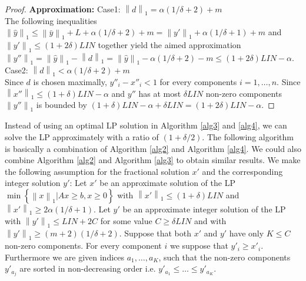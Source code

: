 \documentclass[a4paper,11pt]{article}
\newcommand{\mengest}[2]{\left\{#1|#2\right\}}
\newcommand{\nor}[1]{\left\|#1\right\|}
\begin{document}
\begin{proof}
	{\bf Approximation:} Case1: $\nor{d}_1 = \alpha (1/ \delta +2)+ m$\\
	The following inequalities $\nor{\hat{y}}_1 \leq \nor{\bar{y}}_1 +L +\alpha(1/ \delta +2) +m = 
	\nor{y'}_1 + \alpha(1/\delta+1) +m$ and
	$\nor{y'}_1 \leq (1+2\delta) \mathit{LIN}$ together yield the aimed approximation
	$\nor{y''}_1 = \nor{\hat{y}}_1 - \nor{d}_1 = \nor{\hat{y}}_1 -\alpha(1/\delta+2) -m 
	\leq (1+2\delta) \mathit{LIN} - \alpha$.\\
	Case2: $\nor{d}_1 < \alpha (1/ \delta +2)+ m$\\
	Since $d$ is chosen maximally, $y''_i-x''_i < 1$ for every components $i= 1, \ldots ,n$. Since 
	$\nor{x''}_1 \leq (1+\delta) \mathit{LIN} - \alpha$	and $y''$ has at most $\delta \mathit{LIN}$ non-zero
	components $\nor{y''}_1$ is bounded by $(1+\delta) \mathit{LIN} - \alpha + \delta \mathit{LIN} = 
	(1+2\delta) \mathit{LIN} - \alpha$.
\end{proof}
Instead of using an optimal LP solution in Algorithm \ref{alg3} and \ref{alg4}, we can solve the LP approximately 
with a ratio of $(1+\delta /2)$. The following algorithm is basically a combination of Algorithm \ref{alg2} and Algorithm \ref{alg4}.
We could also combine Algorithm \ref{alg2} and Algorithm \ref{alg3} to obtain similar results.
We make the following assumption for the fractional solution $x'$ and the corresponding integer solution $y'$:
Let $x'$ be an approximate solution of the LP $\min \mengest{\nor{x}_1}{Ax \geq b, x \geq 0 }$ with
$\nor{x'}_1 \leq (1+ \delta) \mathit{LIN}$ and $\nor{x'}_1 \geq 2 \alpha (1/ \delta +1)$.
Let $y'$ be an approximate integer solution of the LP with $\nor{y'}_1 \leq \mathit{LIN} +2C$ for some value 
$C \geq \delta \mathit{LIN}$ and with $\nor{y'}_1 \geq (m+2)(1/\delta +2)$. 
Suppose that both $x'$ and $y'$ have only $K \leq C$
non-zero components. 
For every component $i$ we suppose that $y'_i \geq x'_i$.
Furthermore we are given indices $a_1, \ldots ,a_K$, such that the non-zero components $y'_{a_j}$ are
sorted in non-decreasing order i.e. $y'_{a_1} \leq \ldots \leq y'_{a_K}$.
\newpage
\end{document}
